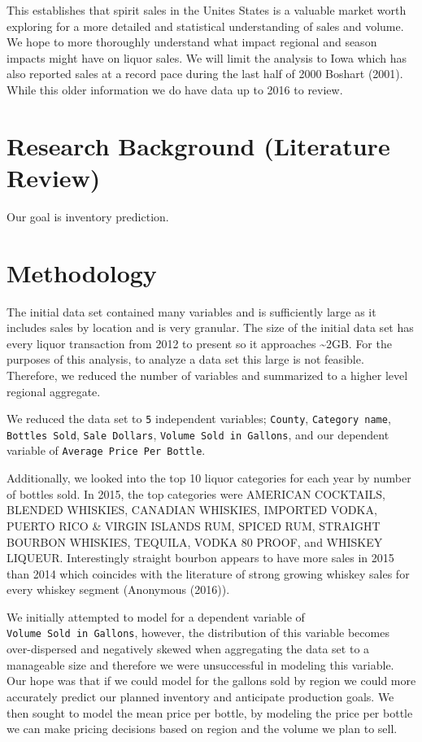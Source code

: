 \documentclass[]{elsarticle} %
\begin{document}
This establishes that spirit sales in the Unites States is a valuable
market worth exploring for a more detailed and statistical understanding
of sales and volume. We hope to more thoroughly understand what impact
regional and season impacts might have on liquor sales. We will limit
the analysis to Iowa which has also reported sales at a record pace
during the last half of 2000 Boshart (2001). While this older
information we do have data up to 2016 to review.

\section{Research Background (Literature
Review)}\label{research-background-literature-review}

Our goal is inventory prediction.

\section{Methodology}\label{methodology}

The initial data set contained many variables and is sufficiently large
as it includes sales by location and is very granular. The size of the
initial data set has every liquor transaction from 2012 to present so it
approaches \textasciitilde{}2GB. For the purposes of this analysis, to
analyze a data set this large is not feasible. Therefore, we reduced the
number of variables and summarized to a higher level regional aggregate.

We reduced the data set to \texttt{5} independent variables;
\texttt{County}, \texttt{Category\ name}, \texttt{Bottles\ Sold},
\texttt{Sale\ Dollars}, \texttt{Volume\ Sold\ in\ Gallons}, and our
dependent variable of \texttt{Average\ Price\ Per\ Bottle}.

Additionally, we looked into the top 10 liquor categories for each year
by number of bottles sold. In 2015, the top categories were AMERICAN
COCKTAILS, BLENDED WHISKIES, CANADIAN WHISKIES, IMPORTED VODKA, PUERTO
RICO \& VIRGIN ISLANDS RUM, SPICED RUM, STRAIGHT BOURBON WHISKIES,
TEQUILA, VODKA 80 PROOF, and WHISKEY LIQUEUR. Interestingly straight
bourbon appears to have more sales in 2015 than 2014 which coincides
with the literature of strong growing whiskey sales for every whiskey
segment (Anonymous (2016)).

We initially attempted to model for a dependent variable of
\texttt{Volume\ Sold\ in\ Gallons}, however, the distribution of this
variable becomes over-dispersed and negatively skewed when aggregating
the data set to a manageable size and therefore we were unsuccessful in
modeling this variable. Our hope was that if we could model for the
gallons sold by region we could more accurately predict our planned
inventory and anticipate production goals. We then sought to model the
mean price per bottle, by modeling the price per bottle we can make
pricing decisions based on region and the volume we plan to sell.
\end{document}
